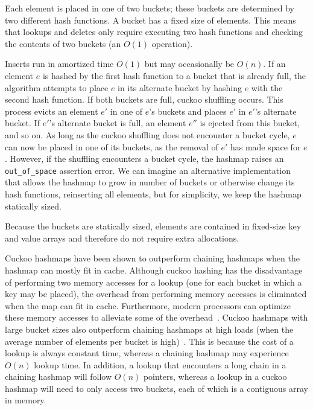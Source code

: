 Each element is placed in one of two buckets; these buckets are determined by two different hash functions. A bucket has a fixed size of elements. This means that lookups and deletes only require executing two hash functions and checking the contents of two buckets (an $O(1)$ operation).

Inserts run in amortized time $O(1)$ but may occasionally be $O(n)$.
If an element $e$ is hashed by the first hash function to a bucket that is already full, the algorithm attempts to place $e$ in its alternate bucket by hashing $e$ with the second hash function. If both buckets are full, cuckoo shuffling occurs. This process evicts an element $e'$ in one of $e$'s buckets and places $e'$ in $e'$'s alternate bucket. If $e'$'s alternate bucket is full, an element $e''$ is ejected from this bucket, and so on. As long as the cuckoo shuffling does not encounter a bucket cycle, $e$ can now be placed in one of its buckets, as the removal of $e'$ has made space for $e$.
However, if the shuffling encounters a bucket cycle, the hashmap raises an \texttt{{out\_of\_space}} assertion error. We can imagine an alternative implementation that allows the hashmap to grow in number of buckets or otherwise change its hash functions, reinserting all elements, but for simplicity, we keep the hashmap statically sized.

Because the buckets are statically sized, elements are contained in fixed-size key and value arrays and therefore do not require extra allocations.

Cuckoo hashmaps have been shown to outperform chaining hashmaps when the hashmap can mostly fit in cache. Although cuckoo hashing has the disadvantage of performing two memory accesses for a lookup (one for each bucket in which a key may be placed), the overhead from performing memory accesses is eliminated when the map can fit in cache.
Furthermore, modern processors can optimize these memory accesses to alleviate some of the overhead~\cite{chm_arch}.
Cuckoo hashmaps with large bucket sizes also outperform chaining hashmaps at high loads (when the average number of elements per bucket is high)~\cite{chm_load}. This is because the cost of a lookup is always constant time, whereas a chaining hashmap may experience $O(n)$ lookup time. In addition, a lookup that encounters a long chain in a chaining hashmap will follow $O(n)$ pointers, whereas a lookup in a cuckoo hashmap will need to only access two buckets, each of which is a contiguous array in memory.

